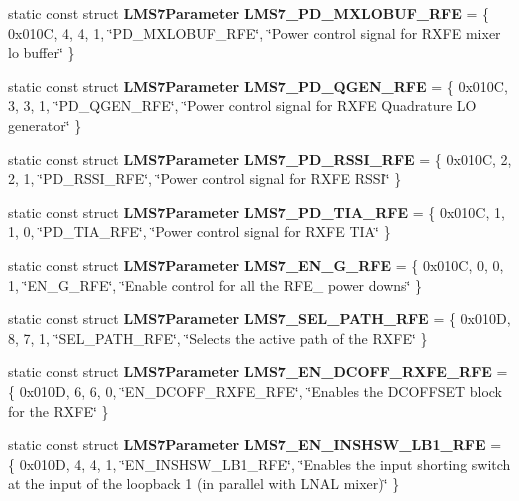 \begin{DoxyCompactItemize}
static const struct {\bf L\+M\+S7\+Parameter} {\bf L\+M\+S7\+\_\+\+P\+D\+\_\+\+M\+X\+L\+O\+B\+U\+F\+\_\+\+R\+FE} = \{ 0x010\+C, 4, 4, 1, \char`\"{}\+P\+D\+\_\+\+M\+X\+L\+O\+B\+U\+F\+\_\+\+R\+F\+E\char`\"{}, \char`\"{}\+Power control signal for R\+X\+F\+E mixer lo buffer\char`\"{} \}
\item 
static const struct {\bf L\+M\+S7\+Parameter} {\bf L\+M\+S7\+\_\+\+P\+D\+\_\+\+Q\+G\+E\+N\+\_\+\+R\+FE} = \{ 0x010\+C, 3, 3, 1, \char`\"{}\+P\+D\+\_\+\+Q\+G\+E\+N\+\_\+\+R\+F\+E\char`\"{}, \char`\"{}\+Power control signal for R\+X\+F\+E Quadrature L\+O generator\char`\"{} \}
\item 
static const struct {\bf L\+M\+S7\+Parameter} {\bf L\+M\+S7\+\_\+\+P\+D\+\_\+\+R\+S\+S\+I\+\_\+\+R\+FE} = \{ 0x010\+C, 2, 2, 1, \char`\"{}\+P\+D\+\_\+\+R\+S\+S\+I\+\_\+\+R\+F\+E\char`\"{}, \char`\"{}\+Power control signal for R\+X\+F\+E R\+S\+S\+I\char`\"{} \}
\item 
static const struct {\bf L\+M\+S7\+Parameter} {\bf L\+M\+S7\+\_\+\+P\+D\+\_\+\+T\+I\+A\+\_\+\+R\+FE} = \{ 0x010\+C, 1, 1, 0, \char`\"{}\+P\+D\+\_\+\+T\+I\+A\+\_\+\+R\+F\+E\char`\"{}, \char`\"{}\+Power control signal for R\+X\+F\+E T\+I\+A\char`\"{} \}
\item 
static const struct {\bf L\+M\+S7\+Parameter} {\bf L\+M\+S7\+\_\+\+E\+N\+\_\+\+G\+\_\+\+R\+FE} = \{ 0x010\+C, 0, 0, 1, \char`\"{}\+E\+N\+\_\+\+G\+\_\+\+R\+F\+E\char`\"{}, \char`\"{}\+Enable control for all the R\+F\+E\+\_ power downs\char`\"{} \}
\item 
static const struct {\bf L\+M\+S7\+Parameter} {\bf L\+M\+S7\+\_\+\+S\+E\+L\+\_\+\+P\+A\+T\+H\+\_\+\+R\+FE} = \{ 0x010\+D, 8, 7, 1, \char`\"{}\+S\+E\+L\+\_\+\+P\+A\+T\+H\+\_\+\+R\+F\+E\char`\"{}, \char`\"{}\+Selects the active path of the R\+X\+F\+E\char`\"{} \}
\item 
static const struct {\bf L\+M\+S7\+Parameter} {\bf L\+M\+S7\+\_\+\+E\+N\+\_\+\+D\+C\+O\+F\+F\+\_\+\+R\+X\+F\+E\+\_\+\+R\+FE} = \{ 0x010\+D, 6, 6, 0, \char`\"{}\+E\+N\+\_\+\+D\+C\+O\+F\+F\+\_\+\+R\+X\+F\+E\+\_\+\+R\+F\+E\char`\"{}, \char`\"{}\+Enables the D\+C\+O\+F\+F\+S\+E\+T block for the R\+X\+F\+E\char`\"{} \}
\item 
static const struct {\bf L\+M\+S7\+Parameter} {\bf L\+M\+S7\+\_\+\+E\+N\+\_\+\+I\+N\+S\+H\+S\+W\+\_\+\+L\+B1\+\_\+\+R\+FE} = \{ 0x010\+D, 4, 4, 1, \char`\"{}\+E\+N\+\_\+\+I\+N\+S\+H\+S\+W\+\_\+\+L\+B1\+\_\+\+R\+F\+E\char`\"{}, \char`\"{}\+Enables the input shorting switch at the input of the loopback 1 (in parallel with L\+N\+A\+L mixer)\char`\"{} \}
\item 

\end{DoxyCompactItemize}
